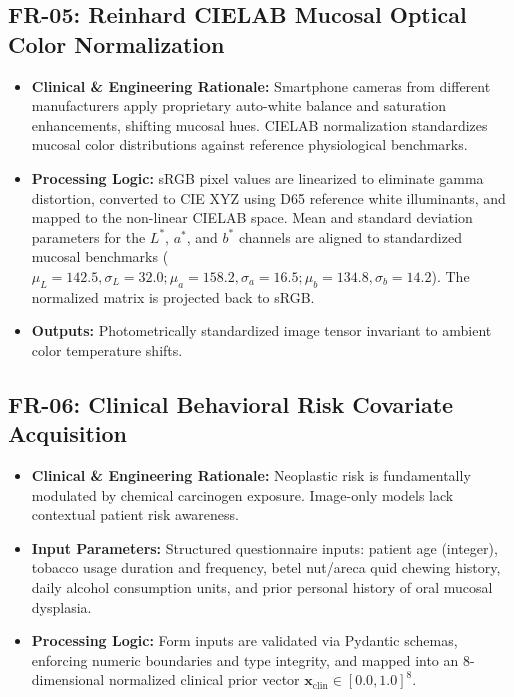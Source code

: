 \documentclass[12pt,a4paper,oneside]{report}
\begin{document}
\subsection{FR-05: Reinhard CIELAB Mucosal Optical Color Normalization}
\begin{itemize}
    \item \textbf{Clinical \& Engineering Rationale:} Smartphone cameras from different manufacturers apply proprietary auto-white balance and saturation enhancements, shifting mucosal hues. CIELAB normalization standardizes mucosal color distributions against reference physiological benchmarks.
    \item \textbf{Processing Logic:} sRGB pixel values are linearized to eliminate gamma distortion, converted to CIE XYZ using D65 reference white illuminants, and mapped to the non-linear CIELAB space. Mean and standard deviation parameters for the $L^*$, $a^*$, and $b^*$ channels are aligned to standardized mucosal benchmarks ($\mu_L=142.5, \sigma_L=32.0; \mu_a=158.2, \sigma_a=16.5; \mu_b=134.8, \sigma_b=14.2$). The normalized matrix is projected back to sRGB.
    \item \textbf{Outputs:} Photometrically standardized image tensor invariant to ambient color temperature shifts.
\end{itemize}

\subsection{FR-06: Clinical Behavioral Risk Covariate Acquisition}
\begin{itemize}
    \item \textbf{Clinical \& Engineering Rationale:} Neoplastic risk is fundamentally modulated by chemical carcinogen exposure. Image-only models lack contextual patient risk awareness.
    \item \textbf{Input Parameters:} Structured questionnaire inputs: patient age (integer), tobacco usage duration and frequency, betel nut/areca quid chewing history, daily alcohol consumption units, and prior personal history of oral mucosal dysplasia.
    \item \textbf{Processing Logic:} Form inputs are validated via Pydantic schemas, enforcing numeric boundaries and type integrity, and mapped into an 8-dimensional normalized clinical prior vector $\mathbf{x}_{\text{clin}} \in [0.0, 1.0]^8$.
\end{itemize}
\end{document}
